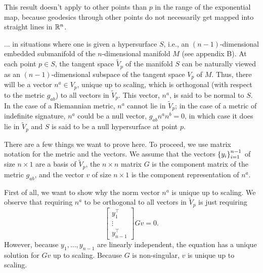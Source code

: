 \documentclass{note}
\numberwithin{equation}{chapter}
\begin{document}
This result doesn't apply to other points than $p$ in the range of the
exponential map, because geodesics through other points do not necessarily get
mapped into straight lines in $\mathbb{R}^n$.

\begin{quotebox}
    ... in situations where one is given a hypersurface $S$, i.e., an $(n -
        1)$-dimensional embedded submanifold of the $n$-dimensional manifold $M$ (see
    appendix B). At each point $p \in S$, the tangent space $\tilde{V}_p$ of the
    manifold $S$ can be naturally viewed as an $(n - 1)$-dimensional subspace of
    the tangent space $V_p$ of $M$. Thus, there will be a vector $n^a \in V_p$,
    unique up to scaling, which is orthogonal (with respect to the metric $g_{ab}$)
    to all vectors in $\tilde{V}_p$. This vector, $n^a$, is said to be normal to
    $S$. In the case of a Riemannian metric, $n^a$ cannot lie in $\tilde{V}_p$; in
    the case of a metric of indefinite signature, $n^a$ could be a null vector,
    $g_{ab}n^a n^b = 0$, in which case it does lie in $\tilde{V}_p$ and $S$ is said
    to be a null hypersurface at point $p$.
\end{quotebox}

There are a few things we want to prove here. To proceed, we use matrix
notation for the metric and the vectors. We assume that the vectors
$\set{y_i}_{i=1}^{n-1}$ of size $n\times 1$ are a basis of $\tilde{V}_p$, the
$n\times n$ matrix $G$ is the component matrix of the metric $g_{ab}$, and the
vector $v$ of size $n\times 1$ is the component representation of $n^a$.

First of all, we want to show why the norm vector $n^a$ is unique up to
scaling. We observe that requiring $n^a$ to be orthogonal to all vectors in
$\tilde{V}_p$ is just requiring
\begin{equation}
    \begin{bmatrix}
        y_1^\top \\
        \vdots   \\
        y_{n-1}^\top
    \end{bmatrix}
    Gv = 0. \label{norm-vector-being-in-hypersurface}
\end{equation}
However, because $y_1, \dots, y_{n-1}$ are linearly independent, the equation
has a unique solution for $Gv$ up to scaling. Because $G$ is non-singular, $v$
is unique up to scaling.
\end{document}
